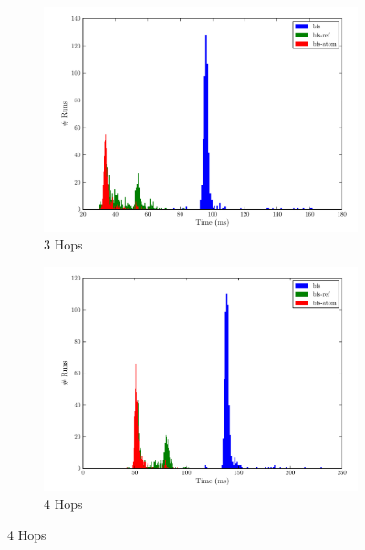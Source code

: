 				\begin{figure}[H]
					\ContinuedFloat
					\begin{subfigure}[b]{.5\linewidth}
						\includegraphics[scale=0.45]{figures/charts/3_hops.pdf}
						\caption{3 Hops}
						\label{subfig:3-hops}
					\end{subfigure}
					\begin{subfigure}[b]{.5\linewidth}
						\includegraphics[scale=0.45]{figures/charts/4_hops.pdf}
						\caption{4 Hops}
						\label{subfig:4-hops}
					\end{subfigure}
				\end{figure}
				
